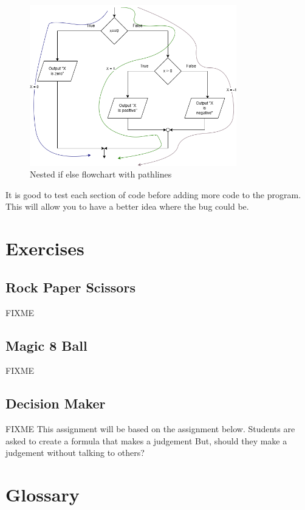 \begin{figure}[h]
    \centering
    \includegraphics[width=9cm]{images/nestedifflow - Path.png}
    \caption{Nested if else flowchart with pathlines}
    \label{fig:nestedpath}
\end{figure}
It is good to test each section of code before adding more code
to the program. This will allow you to have a better idea where the
bug could be.

\section{Exercises}
\subsection{Rock Paper Scissors}
FIXME
\subsection{Magic 8 Ball}
FIXME
\subsection{Decision Maker}
FIXME
This assignment will be based on the assignment below.
Students are asked to create a formula that makes a judgement
But, should they make a judgement without talking to others?


\section{Glossary}

